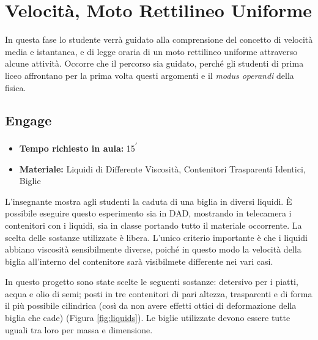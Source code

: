 \documentclass{report} \usepackage[T1]{fontenc} \usepackage[italian]{babel}
\begin{document}
\chapter{Velocità, Moto Rettilineo Uniforme}
In questa fase lo studente verrà guidato alla comprensione del concetto di
velocità media e istantanea, e di legge oraria di un moto rettilineo
uniforme attraverso alcune attività. Occorre che il percorso sia guidato, perché
gli studenti di prima liceo affrontano per la prima volta questi argomenti e
il \emph{modus operandi} della fisica.

\section{Engage}

\begin{itemize}
\item \textbf{Tempo richiesto in aula:} 15\textsuperscript{$\prime$}
\item \textbf{Materiale:} Liquidi di Differente Viscosità, Contenitori Trasparenti Identici, Biglie
\end{itemize}

L’insegnante mostra agli studenti la caduta di una biglia in diversi liquidi. \`E
possibile eseguire questo esperimento sia in DAD, mostrando in telecamera i
contenitori con i liquidi, sia in classe portando tutto il materiale
occorrente. La scelta delle sostanze utilizzate è libera. L’unico criterio importante è
che i liquidi abbiano viscosità sensibilmente diverse, poiché in questo modo la velocità
della biglia all'interno del contenitore sarà visibilmete differente nei vari casi.

In questo progetto sono state scelte le seguenti sostanze: detersivo per i piatti,
acqua e olio di semi; posti in tre contenitori di pari altezza, trasparenti e di forma
il più possibile cilindrica (così da non avere effetti ottici di deformazione della
biglia che cade) (Figura \ref{fig:liquids}).
Le biglie utilizzate devono essere tutte uguali tra loro per massa e dimensione.
\end{document}
